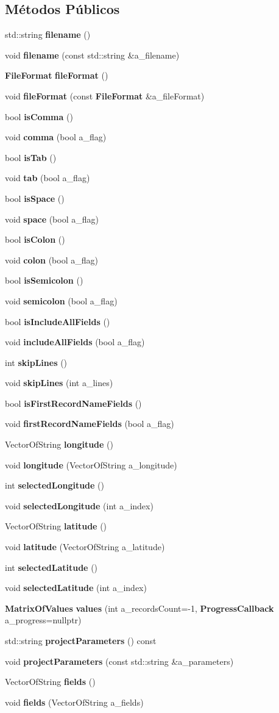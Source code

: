 \subsection*{Métodos Públicos}
\begin{DoxyCompactItemize}
\item 
std\+::string {\bf filename} ()
\item 
void {\bf filename} (const std\+::string \&a\+\_\+filename)
\item 
{\bf File\+Format} {\bf file\+Format} ()
\item 
void {\bf file\+Format} (const {\bf File\+Format} \&a\+\_\+file\+Format)
\item 
bool {\bf is\+Comma} ()
\item 
void {\bf comma} (bool a\+\_\+flag)
\item 
bool {\bf is\+Tab} ()
\item 
void {\bf tab} (bool a\+\_\+flag)
\item 
bool {\bf is\+Space} ()
\item 
void {\bf space} (bool a\+\_\+flag)
\item 
bool {\bf is\+Colon} ()
\item 
void {\bf colon} (bool a\+\_\+flag)
\item 
bool {\bf is\+Semicolon} ()
\item 
void {\bf semicolon} (bool a\+\_\+flag)
\item 
bool {\bf is\+Include\+All\+Fields} ()
\item 
void {\bf include\+All\+Fields} (bool a\+\_\+flag)
\item 
int {\bf skip\+Lines} ()
\item 
void {\bf skip\+Lines} (int a\+\_\+lines)
\item 
bool {\bf is\+First\+Record\+Name\+Fields} ()
\item 
void {\bf first\+Record\+Name\+Fields} (bool a\+\_\+flag)
\item 
Vector\+Of\+String {\bf longitude} ()
\item 
void {\bf longitude} (Vector\+Of\+String a\+\_\+longitude)
\item 
int {\bf selected\+Longitude} ()
\item 
void {\bf selected\+Longitude} (int a\+\_\+index)
\item 
Vector\+Of\+String {\bf latitude} ()
\item 
void {\bf latitude} (Vector\+Of\+String a\+\_\+latitude)
\item 
int {\bf selected\+Latitude} ()
\item 
void {\bf selected\+Latitude} (int a\+\_\+index)
\item 
{\bf Matrix\+Of\+Values} {\bf values} (int a\+\_\+records\+Count=-\/1, {\bf Progress\+Callback} a\+\_\+progress=nullptr)
\item 
std\+::string {\bf project\+Parameters} () const 
\item 
void {\bf project\+Parameters} (const std\+::string \&a\+\_\+parameters)
\item 
Vector\+Of\+String {\bf fields} ()
\item 
void {\bf fields} (Vector\+Of\+String a\+\_\+fields)
\end{DoxyCompactItemize}
